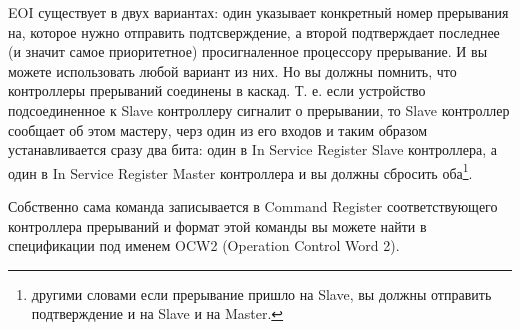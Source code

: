 EOI существует в двух вариантах: один указывает конкретный номер прерывания на,
которое нужно отправить подтсверждение, а второй подтверждает последнее (и
значит самое приоритетное) просигналенное процессору прерывание. И вы можете
использовать любой вариант из них. Но вы должны помнить, что контроллеры
прерываний соединены в каскад. Т. е. если устройство подсоединенное к Slave
контроллеру сигналит о прерывании, то Slave контроллер сообщает об этом мастеру,
черз один из его входов и таким образом устанавливается сразу два бита: один в
In Service Register Slave контроллера, а один в In Service Register Master
контроллера и вы должны сбросить оба\footnote{другими словами если прерывание
пришло на Slave, вы должны отправить подтверждение и на Slave и на Master.}.

Собственно сама команда записывается в Command Register соответствующего
контроллера прерываний и формат этой команды вы можете найти в спецификации под
именем OCW2 (Operation Control Word 2).
